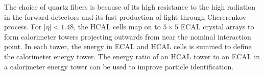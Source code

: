  The choice of quartz fibers is because of its high resistance to the high radiation in the forward detectors and its fast production of light through Chererenkov process. 
\newline
For $\vert \eta \vert < 1.48$, the HCAL cells map on to $5 \times 5$ ECAL crystal arrays to form calorimeter towers projecting  outwards from near the nominal interaction point. 
In each tower, the energy in ECAL and HCAL cells is summed to define the calorimeter energy tower. The energy ratio of an 
HCAL tower to an ECAL in a calorimeter energy tower can be used to improve particle identification. 
